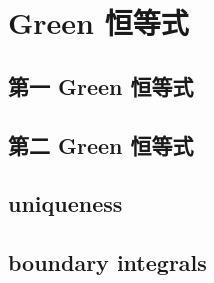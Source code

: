 \section{Green 恒等式}
\label{b2:sec:1302}


\subsection{第一 Green 恒等式}
\label{b2:subsec:130201}

\subsection{第二 Green 恒等式}
\label{b2:subsec:130202}

\subsection{uniqueness}
\label{b2:subsec:130203}

\subsection{boundary integrals}
\label{b2:subsec:130204}


